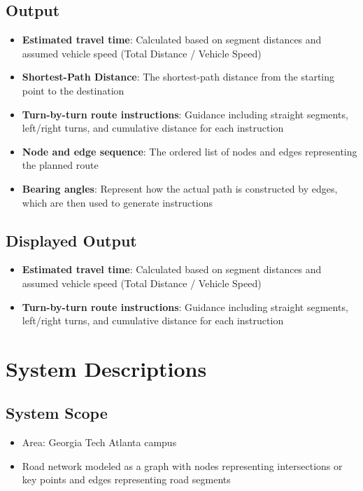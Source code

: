 \documentclass[fleqn,10pt]{olplainarticle}
\begin{document}
\subsection*{Output}
\begin{itemize}
    \item \textbf{Estimated travel time}: Calculated based on segment distances and assumed vehicle speed (Total Distance / Vehicle Speed)
    \item \textbf{Shortest-Path Distance}: The shortest-path distance from the starting point to the destination
    \item \textbf{Turn-by-turn route instructions}: Guidance including straight segments, left/right turns, and cumulative distance for each instruction
    \item \textbf{Node and edge sequence}: The ordered list of nodes and edges representing the planned route
    \item \textbf{Bearing angles}: Represent how the actual path is constructed by edges, which are then used to generate instructions
\end{itemize}

\subsection*{Displayed Output}
\begin{itemize}
    \item \textbf{Estimated travel time}: Calculated based on segment distances and assumed vehicle speed (Total Distance / Vehicle Speed)
    \item \textbf{Turn-by-turn route instructions}: Guidance including straight segments, left/right turns, and cumulative distance for each instruction
\end{itemize}

\section*{System Descriptions}
\subsection*{System Scope}
\begin{itemize}
    \item Area: Georgia Tech Atlanta campus
    \item Road network modeled as a graph with nodes representing intersections or key points and edges representing road segments
\end{itemize}
\end{document}
